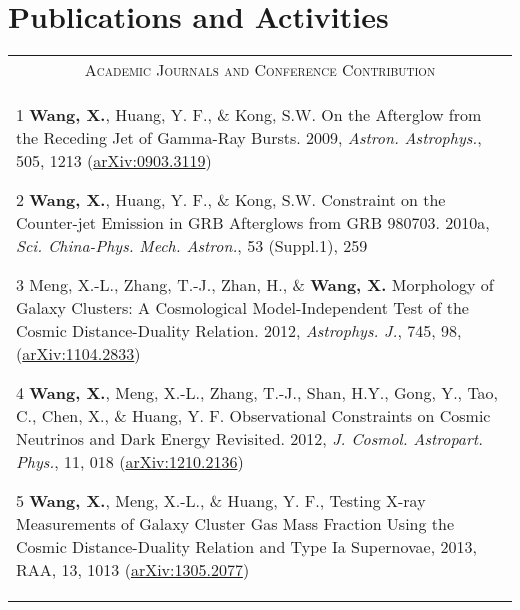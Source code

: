 \documentclass[10pt]{article}
\begin{document}
\section{Publications and Activities}
\begin{longtable}{p{17cm}}
\multicolumn{1}{c}{\textsc{Academic Journals and Conference Contribution}}      \\
\vspace{-0.3cm}
\begin{list}{}{\leftmargin=0.5em}
    \item[1]\hypertarget{09.wang.aa}{} \textbf{Wang, X.}, Huang, Y. F., \& Kong, S.W. On the Afterglow from the Receding Jet of Gamma-Ray Bursts. 2009, \textit{Astron. Astrophys.}, 505, 1213 (\href{http://arxiv.org/abs/0903.3119}{arXiv:0903.3119})
    \item[2]\hypertarget{10.wang.scichina}{} \textbf{Wang, X.}, Huang, Y. F., \& Kong, S.W. Constraint on the Counter-jet Emission in GRB Afterglows from GRB 980703. 2010a, \textit{Sci. China-Phys. Mech. Astron.}, 53 (Suppl.1), 259
    \item[3]\hypertarget{12.meng.apj}{} Meng, X.-L., Zhang, T.-J., Zhan, H., \& \textbf{Wang, X.} Morphology of Galaxy Clusters: A Cosmological Model-Independent Test of the Cosmic Distance-Duality Relation. 2012, \textit{Astrophys. J.}, 745, 98, (\href{http://arxiv.org/abs/1104.2833}{arXiv:1104.2833})
    \item[4]\hypertarget{12.wang.jcap}{} \textbf{Wang, X.}, Meng, X.-L., Zhang, T.-J., Shan, H.Y., Gong, Y., Tao, C., Chen, X., \& Huang, Y. F. Observational Constraints on Cosmic Neutrinos and Dark Energy Revisited. 2012, \textit{J. Cosmol. Astropart. Phys.}, 11, 018 (\href{http://arxiv.org/abs/1210.2136}{arXiv:1210.2136})
    \item[5]\hypertarget{13.wang.raa}{} \textbf{Wang, X.}, Meng, X.-L., \& Huang, Y. F., Testing X-ray Measurements of Galaxy Cluster Gas
  Mass Fraction Using the Cosmic Distance-Duality Relation and Type Ia Supernovae, 2013, RAA, 13, 1013 (\href{http://arxiv.org/abs/1305.2077}{arXiv:1305.2077})
\end{list}  \\
\end{longtable}
\end{document}
